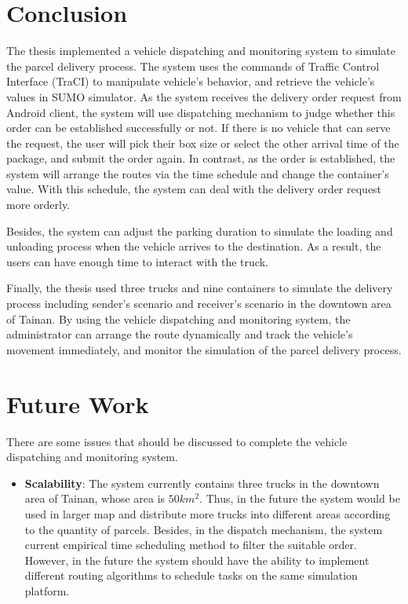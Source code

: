 \documentclass[12pt]{ksthesis}
\begin{document}
\begin{thesis}
{\section{Conclusion}
The thesis implemented a vehicle dispatching and monitoring system to simulate the parcel delivery process. The system uses the commands of Traffic Control Interface (TraCI) to manipulate vehicle’s behavior, and retrieve the vehicle’s values in SUMO simulator. As the system receives the delivery order request from Android client, the system will use dispatching mechanism to judge whether this order can be established successfully or not. If there is no vehicle that can serve the request, the user will pick their box size or select the other arrival time of the package, and submit the order again. In contrast, as the order is established, the system will arrange the routes via the time schedule and change the container’s value. With this schedule, the system can deal with the delivery order request more orderly. 

Besides, the system can adjust the parking duration to simulate the loading and unloading process when the vehicle arrives to the destination. As a result, the users can have enough time to interact with the truck. 

Finally, the thesis used three trucks and nine containers to simulate the delivery process including sender’s scenario and receiver’s scenario in the downtown area of Tainan. By using the vehicle dispatching and monitoring system, the administrator can arrange the route dynamically and track the vehicle’s movement immediately, and monitor the simulation of the parcel delivery process.




\section{Future Work}

There are some issues that should be discussed to complete the vehicle dispatching and monitoring system.

\begin{itemize}


\item
\textbf{Scalability}: The system currently contains three trucks in the downtown area of Tainan, whose area is $50km^{2}$. Thus, in the future the system would be used in larger map and distribute more trucks into different areas according to the quantity of parcels. Besides, in the dispatch mechanism, the system current empirical time scheduling method to filter the suitable order. However, in the future the system should have the ability to implement different routing algorithms to schedule tasks on the same simulation platform.


\end{itemize}}
\end{thesis}
\end{document}
